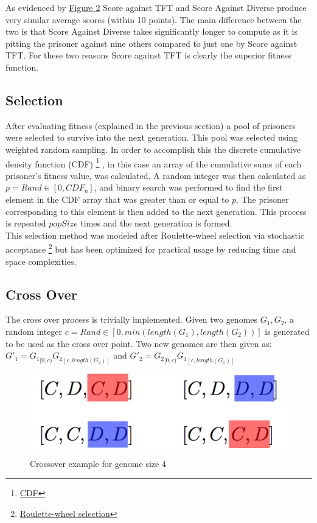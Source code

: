 \documentclass[12pt]{article}
\begin{document}
As evidenced by \hyperref[fig2]{Figure 2} Score against TFT and Score Against Diverse
produce very similar average scores (within 10 points).  The main difference
between the two is that Score Against Diverse takes significantly longer to compute
as it is pitting the prisoner against nine others compared to just one by Score against TFT.
For these two reasons Score against TFT is clearly the superior fitness function.

\subsection{Selection}

After evaluating fitness (explained in the previous section) a pool of
prisoners were selected to survive into the next generation.  This pool was
selected using weighted random sampling.  In order to accomplish this the
discrete cumulative density function (CDF)
\footnote{\href{https://en.wikipedia.org/wiki/Cumulative distribution function}{CDF}}
, in this case an array of the cumulative sums of each prisoner's fitness value,
was calculated.  A random integer was then calculated as $p = Rand \in [0, CDF_n]$,
and binary search was performed to find the first element in the CDF array that
was greater than or equal to $p$.  The prisoner corresponding to this element
is then added to the next generation.  This process is repeated $popSize$ times
and the next generation is formed. \\

This selection method was modeled after Roulette-wheel selection via stochastic acceptance
\footnote{\href{http://arxiv.org/pdf/1109.3627.pdf}{Roulette-wheel selection}}
but has been optimized for practical usage by reducing time and space complexities.

\subsection{Cross Over}

The cross over process is trivially implemented.  Given two genomes $G_1, G_2$,
a random integer $c = Rand \in [0, min(length(G_1), length(G_2))]$ is generated
to be used as the cross over point.  Two new genomes are then given as:\\

$G'_1 = {G_1}_{[0,c)}{G_2}_{[c, length(G_2)]}$ and
$G'_2 = {G_2}_{[0, c)}{G_1}_{[c, length(G_1)]}$ \\

\begin{figure}[h]
    \centering
    \includegraphics[scale=0.5]{figures/crossover-example.png}
    \caption{Crossover example for genome size 4}
\end{figure}
\end{document}

